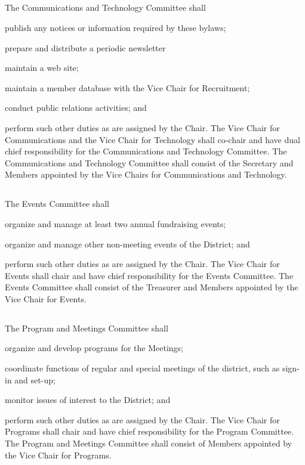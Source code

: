 \subsection{} \label{comms-tech-committee}
The Communications and Technology Committee shall
\begin{inlinealphalist}
    \item publish any notices or information required by these bylaws;
    \item prepare and distribute a periodic newsletter
    \item maintain a web site;
    \item maintain a member database with the Vice Chair for Recruitment;
    \item conduct public relations activities; and
    \item perform such other duties as are assigned by the Chair. The Vice Chair for Communications and the Vice Chair for Technology shall co-chair and have dual chief responsibility for the Communications and Technology Committee. The Communications and Technology Committee shall consist of the Secretary and Members appointed by the Vice Chairs for Communications and Technology.
\end{inlinealphalist}

\subsection{} \label{events-committee}
The Events Committee shall
\begin{inlinealphalist}
    \item organize and manage at least two annual fundraising events;
    \item organize and manage other non-meeting events of the \fortythird{} District; and
    \item perform such other duties as are assigned by the Chair. The Vice Chair for Events shall chair and have chief responsibility for the Events Committee. The Events Committee shall consist of the Treasurer and Members appointed by the Vice Chair for Events.
\end{inlinealphalist}

\subsection{} \label{meetings-committee}
The Program and Meetings Committee shall
\begin{inlinealphalist}
    \item organize and develop programs for the Meetings;
    \item coordinate functions of regular and special meetings of the district, such as sign-in and set-up;
    \item monitor issues of interest to the \fortythird{} District; and
    \item perform such other duties as are assigned by the Chair. The Vice Chair for Programs shall chair and have chief responsibility for the Program Committee. The Program and Meetings Committee shall consist of Members appointed by the Vice Chair for Programs.
\end{inlinealphalist}

